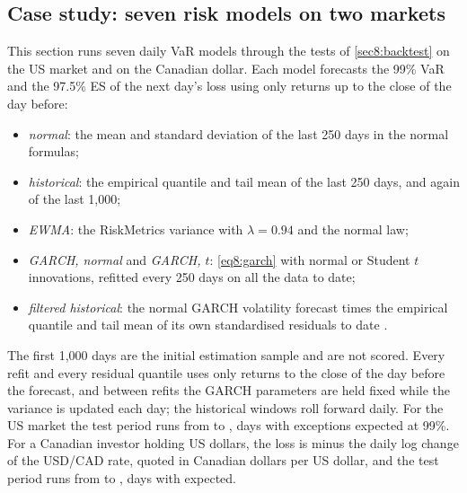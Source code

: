 \begin{chapterrefs}
\FloatBarrier
\section{Case study: seven risk models on two markets}
\label{sec8:case}

 This section runs seven daily VaR models through the tests of \cref{sec8:backtest} on the US market
and on the Canadian dollar. Each model forecasts the 99\% VaR and the 97.5\% ES of the next day's loss
using only returns up to the close of the day before:
\begin{itemize}
  \item \emph{normal}: the mean and standard deviation of the last 250 days in the normal formulas;
  \item \emph{historical}: the empirical quantile and tail mean of the last 250 days, and again of the
        last 1,000;
  \item \emph{EWMA}: the RiskMetrics variance with $\lambda=0.94$ and the normal law;
  \item \emph{GARCH, normal} and \emph{GARCH, $t$}: \cref{eq8:garch} with normal or Student $t$
        innovations, refitted every 250 days on all the data to date;
  \item \emph{filtered historical}: the normal GARCH volatility forecast times the empirical quantile and tail
        mean of its own standardised residuals to date \parencite{barone1999,hull1998}.
\end{itemize}
The first 1,000 days are the initial estimation sample and are not scored. Every refit and every
residual quantile uses only returns to the close of the day before the forecast, and between refits the
GARCH parameters are held fixed while the variance is updated each day; the historical windows roll
forward daily. For the US market the test period runs from
\caFirst{} to \tdLast, \caN{} days with \caExpected{} exceptions expected at 99\%. For a Canadian
investor holding US dollars, the loss is minus the daily log change of the USD/CAD rate, quoted in
Canadian dollars per US dollar, and the
test period runs from \cyFirst{} to \cyLast, \cyN{} days with \cyExpected{} expected.


\end{chapterrefs}

